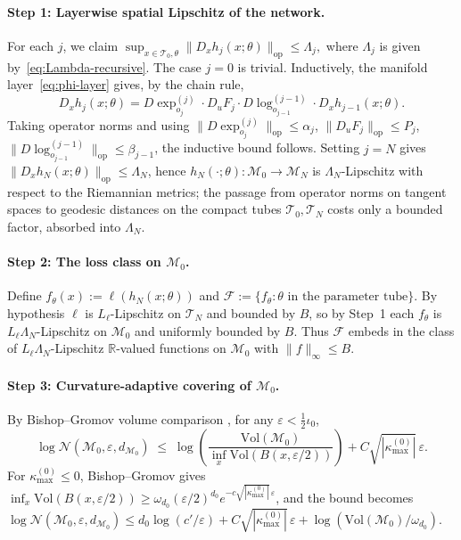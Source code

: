 \documentclass[letterpaper]{article}
\newcommand{\R}{\mathbb{R}}
\begin{document}
\paragraph{Step 1: Layerwise spatial Lipschitz of the network.}
For each $j$, we claim
\(
\sup_{x\in\mathcal T_0,\theta}\|D_x h_j(x;\theta)\|_{\mathrm{op}} \le \Lambda_j,
\)
where $\Lambda_j$ is given by~\eqref{eq:Lambda-recursive}.
The case $j=0$ is trivial. Inductively, the manifold
layer~\eqref{eq:phi-layer} gives, by the chain rule,
\[
D_x h_j(x;\theta)
=
D\exp_{o_j}^{(j)}\!\cdot\!D_u F_j \!\cdot\!D\log_{o_{j-1}}^{(j-1)}\!\cdot\! D_x h_{j-1}(x;\theta).
\]
Taking operator norms and using
$\|D\exp_{o_j}^{(j)}\|_{\mathrm{op}}\le \alpha_j$,
$\|D_u F_j\|_{\mathrm{op}}\le P_j$,
$\|D\log_{o_{j-1}}^{(j-1)}\|_{\mathrm{op}}\le \beta_{j-1}$,
the inductive bound follows. Setting $j=N$ gives
$\|D_x h_N(x;\theta)\|_{\mathrm{op}}\le \Lambda_N$, hence
$h_N(\cdot;\theta) : \mathcal M_0 \to \mathcal M_N$ is
$\Lambda_N$-Lipschitz with respect to the Riemannian metrics; the passage
from operator norms on tangent spaces to geodesic distances on the
compact tubes $\mathcal T_0, \mathcal T_N$ costs only a bounded factor,
absorbed into $\Lambda_N$.

\paragraph{Step 2: The loss class on $\mathcal M_0$.}
Define $f_\theta(x):=\ell(h_N(x;\theta))$ and
$\mathcal F := \{f_\theta : \theta \text{ in the parameter tube}\}$. By
hypothesis $\ell$ is $L_\ell$-Lipschitz on $\mathcal T_N$ and bounded by
$B$, so by Step~1 each $f_\theta$ is $L_\ell \Lambda_N$-Lipschitz on
$\mathcal M_0$ and uniformly bounded by $B$. Thus $\mathcal F$ embeds in
the class of $L_\ell \Lambda_N$-Lipschitz $\R$-valued functions on
$\mathcal M_0$ with $\|f\|_\infty \le B$.

\paragraph{Step 3: Curvature-adaptive covering of $\mathcal M_0$.}
By Bishop--Gromov volume comparison
\cite[Theorem~3.1]{sarkar2025learning}, for any
$\varepsilon < \tfrac12 \iota_0$,
\[
\log \mathcal N(\mathcal M_0, \varepsilon, d_{\mathcal M_0})
\;\le\;
\log\!\left(\frac{\mathrm{Vol}(\mathcal M_0)}{\inf_{x}\mathrm{Vol}(B(x,\varepsilon/2))}\right)
+ C\sqrt{|\kappa_{\max}^{(0)}|}\,\varepsilon.
\]
For $\kappa_{\max}^{(0)} \le 0$, Bishop--Gromov gives
$\inf_x \mathrm{Vol}(B(x,\varepsilon/2)) \ge
\omega_{d_0}(\varepsilon/2)^{d_0} e^{-c\sqrt{|\kappa_{\max}^{(0)}|}\,\varepsilon}$,
and the bound becomes
\(
\log\mathcal N(\mathcal M_0,\varepsilon,d_{\mathcal M_0})
\le d_0 \log(c'/\varepsilon)
+ C\sqrt{|\kappa_{\max}^{(0)}|}\,\varepsilon
+ \log(\mathrm{Vol}(\mathcal M_0)/\omega_{d_0}).
\)
\end{document}
